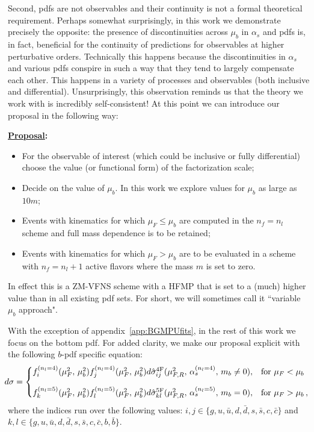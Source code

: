 \documentclass[letter,11pt]{article}
\def\as{\alpha_s}
\newcommand{\muF}{\mu_F}
\def\nf{{n_f}}
\def\nl{{n_l}}
\def\mub{\mu_b}
\begin{document}
Second, pdfs are not observables and their continuity is not a formal theoretical requirement. Perhaps somewhat surprisingly, in this work we demonstrate precisely the opposite: the presence of discontinuities across $\mub$ in $\as$ and pdfs is, in fact, beneficial for the continuity of predictions for observables at higher perturbative orders. Technically this happens because the discontinuities in $\as$ and various pdfs conspire in such a way that they tend to largely compensate each other. This happens in a variety of processes and observables (both inclusive and differential). Unsurprisingly, this observation reminds us that the theory we work with is incredibly self-consistent! At this point we can introduce our proposal in the following way: 

\newpage 

\centerline{\bf \underline{Proposal}:}
%
\begin{itemize}
\item For the observable of interest (which could be inclusive or fully differential) choose the value (or functional form) of the factorization scale;
\item Decide on the value of $\mub$. In this work we explore values for $\mub$ as large as $10 m$;
\item Events with kinematics for which $\muF\leq\mub$ are computed in the $\nf=\nl$ scheme and full mass dependence is to be retained;
\item Events with kinematics for which $\muF > \mub$ are to be evaluated in a scheme with $\nf=\nl+1$ active flavors where the mass $m$ is set to zero.
\end{itemize}
%
In effect this is a ZM-VFNS scheme with a HFMP that is set to a (much) higher value than in all existing pdf sets. For short, we will sometimes call it ``variable $\mub$ approach".

With the exception of appendix~\ref{app:BGMPUfits}, in the rest of this work we focus on the bottom pdf. For added clarity, we make our proposal explicit with the following $b$-pdf specific equation:
%
\begin{equation}
\hskip -2mm
d\sigma =
\begin{cases}
f^{(n_l=4)}_i(\mu_F^2,\, \mub^2) f^{(n_l=4)}_j(\mu_F^2,\, \mub^2) d\hat\sigma_{ij}^{\rm 4F}(\mu_{F,R}^2,\,\as^{(\nl=4)},\,m_b\neq0), &\text{for $\mu_F < \mub$}
\\[10pt]
f^{(n_l=5)}_k(\mu_F^2,\, \mub^2) f^{(n_l=5)}_l(\mu_F^2,\, \mub^2) d\hat\sigma_{kl}^{\rm 5F}(\mu_{F,R}^2,\,\as^{(n_l=5)},\,m_b=0), &\text{for $\mu_F > \mub$}\,,
\end{cases}
\end{equation}
%
where the indices run over the following values: $i,j \in \{g,u,\bar{u},d,\bar{d},s,\bar{s},c,\bar{c}\}$ and $k,l \in \{g,u,\bar{u},d,\bar{d},s,\bar{s},c,\bar{c},b,\bar{b}\}$. 
\end{document}

